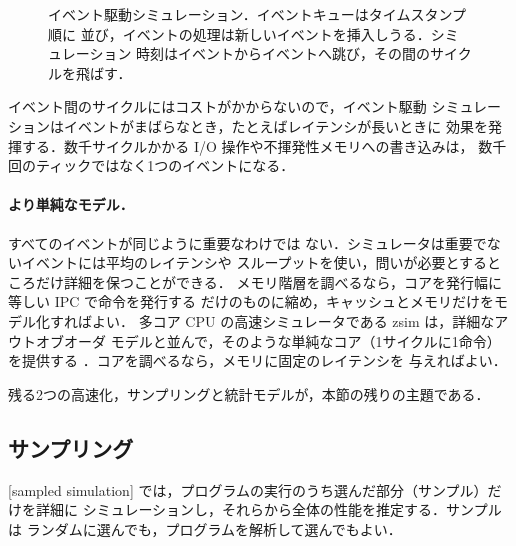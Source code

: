 \documentclass[../main.tex]{subfiles}
\begin{document}
\begin{figure}[tb]
  \centering
  
  \caption{イベント駆動シミュレーション．イベントキューはタイムスタンプ順に
    並び，イベントの処理は新しいイベントを挿入しうる．シミュレーション
    時刻はイベントからイベントへ跳び，その間のサイクルを飛ばす．}
  \label{fig:l08-event-queue}
\end{figure}

イベント間のサイクルにはコストがかからないので，イベント駆動
シミュレーションはイベントがまばらなとき，たとえばレイテンシが長いときに
効果を発揮する．数千サイクルかかる I/O 操作や不揮発性メモリへの書き込みは，
数千回のティックではなく1つのイベントになる．

\paragraph{より単純なモデル．}  すべてのイベントが同じように重要なわけでは
ない．シミュレータは重要でないイベントには平均のレイテンシや
スループットを使い，問いが必要とするところだけ詳細を保つことができる．
メモリ階層を調べるなら，コアを発行幅に等しい IPC で命令を発行する
だけのものに縮め，キャッシュとメモリだけをモデル化すればよい．
多コア CPU の高速シミュレータである zsim は，詳細なアウトオブオーダ
モデルと並んで，そのような単純なコア（1サイクルに1命令）を提供する
\cite{sanchez2013zsim}．コアを調べるなら，メモリに固定のレイテンシを
与えればよい．

残る2つの高速化，サンプリングと統計モデルが，本節の残りの主題である．

\subsection{サンプリング}

\begin{definition}[サンプリングシミュレーション]
  \label{def:l08-sampled}
  [sampled simulation]
  では，プログラムの実行のうち選んだ部分（サンプル）だけを詳細に
  シミュレーションし，それらから全体の性能を推定する．サンプルは
  ランダムに選んでも，プログラムを解析して選んでもよい．
\end{definition}
\end{document}
